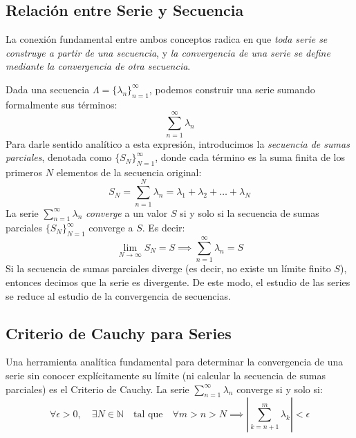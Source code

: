 \documentclass[a4paper]{article}
\begin{document}
\subsection*{Relación entre Serie y Secuencia}
La conexión fundamental entre ambos conceptos radica en que \textit{toda serie se construye a partir de una secuencia}, y \textit{la convergencia de una serie se define mediante la convergencia de otra secuencia}. 

Dada una secuencia $\Lambda = \{\lambda_n\}_{n=1}^{\infty}$, podemos construir una serie sumando formalmente sus términos:
$$ \sum_{n=1}^{\infty} \lambda_n $$
Para darle sentido analítico a esta expresión, introducimos la \textit{secuencia de sumas parciales}, denotada como $\{S_N\}_{N=1}^{\infty}$, donde cada término es la suma finita de los primeros $N$ elementos de la secuencia original:
$$ S_N = \sum_{n=1}^{N} \lambda_n = \lambda_1 + \lambda_2 + \dots + \lambda_N $$
La serie $\sum_{n=1}^{\infty} \lambda_n$ \textit{converge} a un valor $S$ si y solo si la secuencia de sumas parciales $\{S_N\}_{N=1}^{\infty}$ converge a $S$. Es decir:
$$ \lim_{N \to \infty} S_N = S \implies \sum_{n=1}^{\infty} \lambda_n = S $$
Si la secuencia de sumas parciales diverge (es decir, no existe un límite finito $S$), entonces decimos que la serie es divergente. De este modo, el estudio de las series se reduce al estudio de la convergencia de secuencias.

\subsection*{Criterio de Cauchy para Series}
Una herramienta analítica fundamental para determinar la convergencia de una serie sin conocer explícitamente su límite (ni calcular la secuencia de sumas parciales) es el Criterio de Cauchy. La serie $\sum_{n=1}^{\infty} \lambda_n$ converge si y solo si:
$$ \forall \epsilon > 0, \quad \exists N \in \mathbb{N} \quad \text{tal que} \quad \forall m > n > N \implies \left| \sum_{k=n+1}^{m} \lambda_k \right| < \epsilon $$
\end{document}
